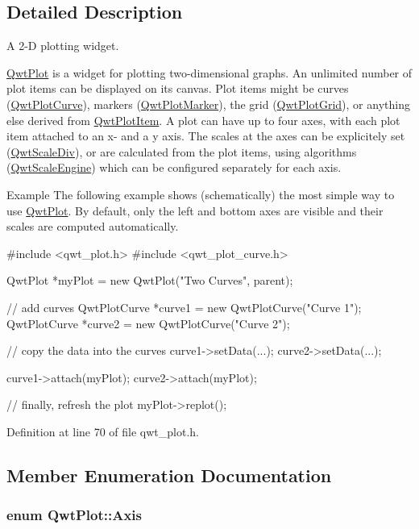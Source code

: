 \subsection{Detailed Description}
A 2-\/\-D plotting widget. 

\hyperlink{class_qwt_plot}{Qwt\-Plot} is a widget for plotting two-\/dimensional graphs. An unlimited number of plot items can be displayed on its canvas. Plot items might be curves (\hyperlink{class_qwt_plot_curve}{Qwt\-Plot\-Curve}), markers (\hyperlink{class_qwt_plot_marker}{Qwt\-Plot\-Marker}), the grid (\hyperlink{class_qwt_plot_grid}{Qwt\-Plot\-Grid}), or anything else derived from \hyperlink{class_qwt_plot_item}{Qwt\-Plot\-Item}. A plot can have up to four axes, with each plot item attached to an x-\/ and a y axis. The scales at the axes can be explicitely set (\hyperlink{class_qwt_scale_div}{Qwt\-Scale\-Div}), or are calculated from the plot items, using algorithms (\hyperlink{class_qwt_scale_engine}{Qwt\-Scale\-Engine}) which can be configured separately for each axis.



\begin{DoxyParagraph}{Example}
The following example shows (schematically) the most simple way to use \hyperlink{class_qwt_plot}{Qwt\-Plot}. By default, only the left and bottom axes are visible and their scales are computed automatically. \begin{DoxyVerb}#include <qwt_plot.h>
#include <qwt_plot_curve.h>

QwtPlot *myPlot = new QwtPlot("Two Curves", parent);

// add curves
QwtPlotCurve *curve1 = new QwtPlotCurve("Curve 1");
QwtPlotCurve *curve2 = new QwtPlotCurve("Curve 2");

// copy the data into the curves
curve1->setData(...);
curve2->setData(...);

curve1->attach(myPlot);
curve2->attach(myPlot);

// finally, refresh the plot
myPlot->replot();
\end{DoxyVerb}
 
\end{DoxyParagraph}


Definition at line 70 of file qwt\-\_\-plot.\-h.



\subsection{Member Enumeration Documentation}
\hypertarget{class_qwt_plot_a81df699dcf9dde0752c0726b5f31e271}{
\subsubsection[{Axis}]{\setlength{\rightskip}{0pt plus 5cm}enum {\bf Qwt\-Plot\-::\-Axis}}}\label{class_qwt_plot_a81df699dcf9dde0752c0726b5f31e271}


